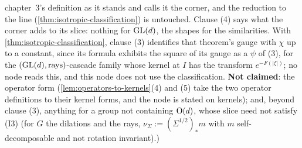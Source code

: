 \begin{proposition}
{chapter~3's definition as it stands and calls it the corner, and the reduction to the line
(\ref{thm:isotropic-classification}) is untouched. Clause (4) says what the corner adds to its
slice: nothing for $\mathrm{GL}(d)$, the shapes for the similarities. With
\ref{thm:isotropic-classification}, clause (3) identifies that theorem's gauge with $\chi$ up to a
constant, since its formula exhibits the square of its gauge as a $\psi$ of (3), for the
$(\mathrm{GL}(d), \text{rays})$-cascade family whose kernel at $I$ has the transform $e^{-F(|\xi|)}$; no node
reads this, and this node does not use the classification. \textbf{Not claimed}: the operator form
(\ref{lem:operators-to-kernels}(4) and (5) take the two operator definitions to their kernel forms,
and the node is stated on kernels); and, beyond clause (3), anything for a group not containing
$\mathrm{O}(d)$, whose slice need not satisfy (I3) (for $G$ the dilations and the rays, $\nu_\Sigma := (\Sigma^{1/2})_*m$ with $m$
self-decomposable and not rotation invariant).)}
\end{proposition}

